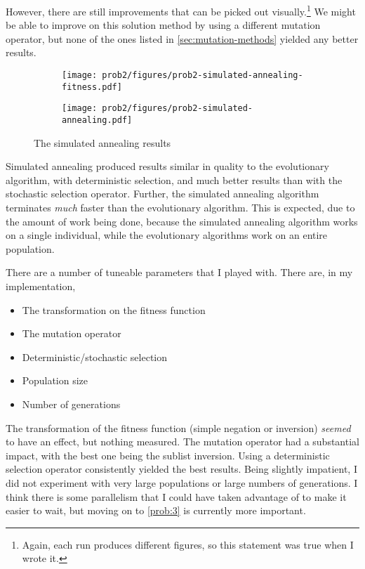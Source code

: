 \documentclass{article}
\begin{document}
However, there are still improvements that can be picked out visually.\footnote{Again, each
    run produces different figures, so this statement was true when I wrote it.} We might be able
to improve on this solution method by using a different mutation operator, but none of the ones
listed in \autoref{sec:mutation-methods} yielded any better results.

\begin{figure}[h]
    \centering
    \begin{subfigure}[b]{0.45\textwidth}
        \texttt{[image: prob2/figures/prob2-simulated-annealing-fitness.pdf]}
        \caption{}\label{fig:prob2:simulated-annealing-fitness}
    \end{subfigure}
    \begin{subfigure}[b]{0.45\textwidth}
        \texttt{[image: prob2/figures/prob2-simulated-annealing.pdf]}
        \caption{}\label{fig:prob2:simulated-annealing-best}
    \end{subfigure}
    \caption{The simulated annealing results}\label{fig:prob2:simulated-annealing}
\end{figure}

Simulated annealing produced results similar in quality to the evolutionary algorithm, with
deterministic selection, and much better results than with the stochastic selection operator.
Further, the simulated annealing algorithm terminates \textit{much} faster than the evolutionary
algorithm. This is expected, due to the amount of work being done, because the simulated annealing
algorithm works on a single individual, while the evolutionary algorithms work on an entire
population.

There are a number of tuneable parameters that I played with. There are, in my implementation,
\begin{itemize}
    \item The transformation on the fitness function
    \item The mutation operator
    \item Deterministic/stochastic selection
    \item Population size
    \item Number of generations
\end{itemize}
The transformation of the fitness function (simple negation or inversion) \textit{seemed} to have
an effect, but nothing measured. The mutation operator had a substantial impact, with the best one
being the sublist inversion. Using a deterministic selection operator consistently yielded the best
results. Being slightly impatient, I did not experiment with very large populations or large
numbers of generations. I think there is some parallelism that I could have taken advantage of to
make it easier to wait, but moving on to \autoref{prob:3} is currently more important.
\end{document}
